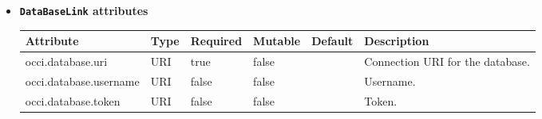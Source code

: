 \begin{itemize}
\item \textbf{\texttt{DataBaseLink} attributes}

\begin{tabularx}{\textwidth}{|l|l|p{1.4cm}|p{1.3cm}|l|X|}
  \hline
  \textbf{Attribute} & \textbf{Type} & \textbf{Required} & \textbf{Mutable} & \textbf{Default} & \textbf{Description} \\
  \hline  
  occi.database.uri & URI & true & false &  & Connection URI for the database. \\
  \hline
  occi.database.username & URI & false & false &  & Username. \\
  \hline
  occi.database.token & URI & false & false &  & Token. \\
  \hline
\end{tabularx}
\end{itemize}


 
